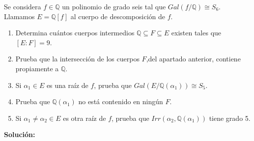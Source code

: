 \begin{exercise}
Se considera $f \in \mathbb{Q}$ un polinomio de grado seis tal que $Gal(f/\mathbb{Q}) \cong S_6$. Llamamos $E = \mathbb{Q}[f]$ al cuerpo de descomposición de $f$. 

\begin{enumerate}
\item Determina cuántos cuerpos intermedios $\mathbb{Q} \subseteq F \subseteq E$ existen tales que $[E:F] = 9$. 
\item Prueba que la intersección de los cuerpos $F$,del apartado anterior, contiene propiamente a $\mathbb{Q}$. 
\item Si $\alpha_1 \in E$ es una raíz de $f$, prueba que $Gal(E/\mathbb{Q}(\alpha_1)) \cong S_5$. 
\item Prueba que $\mathbb{Q}(\alpha_1)$ no está contenido en ningún $F$. 
\item Si $\alpha_1 \neq \alpha_2 \in E$ es otra raíz de $f$, prueba que $Irr(\alpha_2,\mathbb{Q}(\alpha_1))$ tiene grado 5. 
\end{enumerate}
\end{exercise}

\textbf{Solución: }

